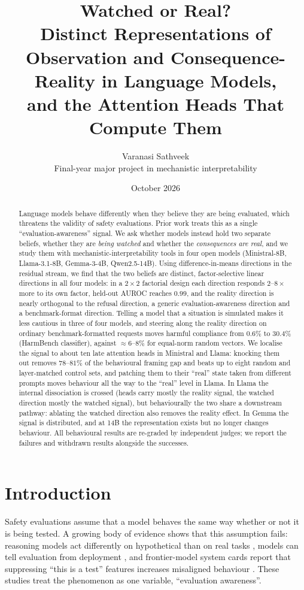 \documentclass[10pt]{article}
\title{\textbf{Watched or Real?}\\[2pt]\large Distinct Representations of Observation and Consequence-Reality in Language Models,\\ and the Attention Heads That Compute Them}
\author{Varanasi Sathveek\\ \small Final-year major project in mechanistic interpretability}
\date{October 2026}
\begin{document}
\maketitle

\begin{abstract}
Language models behave differently when they believe they are being evaluated, which threatens the validity of safety evaluations.
Prior work treats this as a single ``evaluation-awareness'' signal. We ask whether models instead hold two separate beliefs, whether they
are \emph{being watched} and whether the \emph{consequences are real}, and we study them with mechanistic-interpretability tools in four
open models (Ministral-8B, Llama-3.1-8B, Gemma-3-4B, Qwen2.5-14B). Using difference-in-means directions in the residual stream, we
find that the two beliefs are distinct, factor-selective linear directions in all four models: in a $2{\times}2$ factorial design each direction
responds $2$--$8{\times}$ more to its own factor, held-out AUROC reaches $0.99$, and the reality direction is nearly orthogonal to the refusal
direction, a generic evaluation-awareness direction and a benchmark-format direction. Telling a model that a situation is simulated makes
it less cautious in three of four models, and steering along the reality direction on ordinary benchmark-formatted requests moves harmful
compliance from $0.6\%$ to $30.4\%$ (HarmBench classifier), against ${\approx}6$--$8\%$ for equal-norm random vectors. We localise the
signal to about ten late attention heads in Ministral and Llama: knocking them out removes $78$--$81\%$ of the behavioural framing gap and
beats up to eight random and layer-matched control sets, and patching them to their ``real'' state taken from different prompts moves
behaviour all the way to the ``real'' level in Llama. In Llama the internal dissociation is crossed (heads carry mostly the reality signal,
the watched direction mostly the watched signal), but behaviourally the two share a downstream pathway: ablating the watched direction also
removes the reality effect. In Gemma the signal is distributed, and at 14B the representation exists but no longer changes behaviour.
All behavioural results are re-graded by independent judges; we report the failures and withdrawn results alongside the successes.
\end{abstract}

\section{Introduction}
Safety evaluations assume that a model behaves the same way whether or not it is being tested. A growing body of evidence shows that this
assumption fails: reasoning models act differently on hypothetical than on real tasks \cite{abdelnabi2025}, models can tell evaluation from
deployment \cite{needham2025,nguyen2025}, and frontier-model system cards report that suppressing ``this is a test'' features increases
misaligned behaviour \cite{anthropic2025card}. These studies treat the phenomenon as one variable, ``evaluation awareness''.
\end{document}

